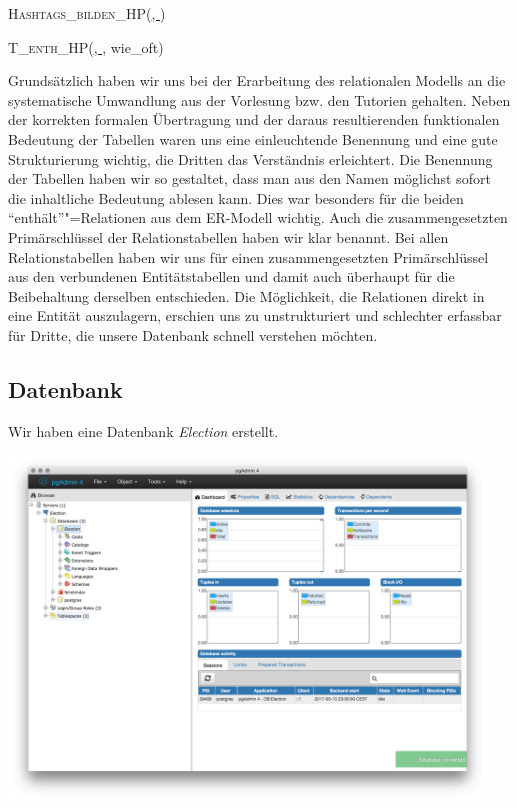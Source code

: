 \documentclass[BCOR0mm,fontsize=12pt,paper=a4,final,numbers=noenddot]{scrartcl}
\begin{document}
\noindent\textsc{Hashtags\_bilden\_HP}(\uline{, })

\noindent\textsc{T\_enth\_HP}(\uline{, }, wie\_oft)

\medskip\noindent{}Grundsätzlich haben wir uns bei der Erarbeitung des relationalen Modells an die systematische Umwandlung aus der Vorlesung bzw. den Tutorien gehalten. Neben der korrekten formalen Übertragung und der daraus resultierenden funktionalen Bedeutung der Tabellen waren uns eine einleuchtende Benennung und eine gute Strukturierung wichtig, die Dritten das Verständnis erleichtert. Die Benennung der Tabellen haben wir so gestaltet, dass man aus den Namen möglichst sofort die inhaltliche Bedeutung ablesen kann. Dies war besonders für die beiden "`enthält"'"=Relationen aus dem ER-Modell wichtig. Auch die zusammengesetzten Primärschlüssel der Relationstabellen haben wir klar benannt. Bei allen Relationstabellen haben wir uns für einen zusammengesetzten Primärschlüssel aus den verbundenen Entitätstabellen und damit auch überhaupt für die Beibehaltung derselben entschieden. Die Möglichkeit, die Relationen direkt in eine Entität auszulagern, erschien uns zu unstrukturiert und schlechter erfassbar für Dritte, die unsere Datenbank schnell verstehen möchten. 

\clearpage

\subsection{Datenbank}
Wir haben eine Datenbank \textit{Election} erstellt.

\includegraphics[width=0.95\textwidth]{datenbank_beweis.png}
\end{document}
